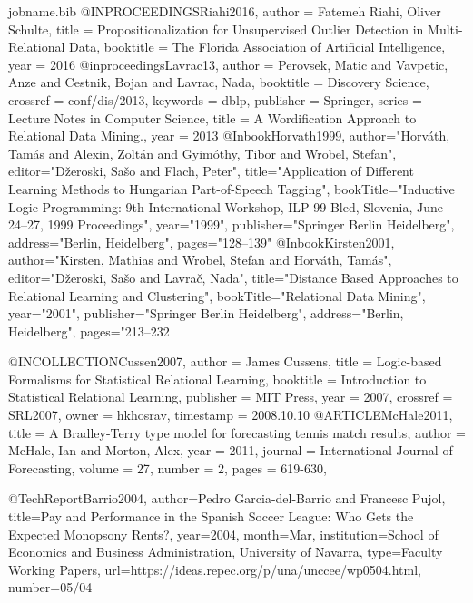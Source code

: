 {\begin{filecontents*}{jobname.bib}
	@INPROCEEDINGS{Riahi2016,
		author = {Fatemeh Riahi, Oliver Schulte},
		title = {Propositionalization for Unsupervised Outlier	Detection in Multi-Relational Data},
		booktitle = {The Florida Association of Artificial Intelligence},
		year = {2016}
	}
	@inproceedings{Lavrac13,
		author = {Perovsek, Matic and Vavpetic, Anze and Cestnik, Bojan and Lavrac, Nada},
		booktitle = {Discovery Science},
		crossref = {conf/dis/2013},
		keywords = {dblp},
		publisher = {Springer},
		series = {Lecture Notes in Computer Science},
		title = {A Wordification Approach to Relational Data Mining.},
		year = 2013
	}
	@Inbook{Horvath1999,
		author="Horv{\'a}th, Tam{\'a}s
		and Alexin, Zolt{\'a}n
		and Gyim{\'o}thy, Tibor
		and Wrobel, Stefan",
		editor="D{\v{z}}eroski, Sa{\v{s}}o
		and Flach, Peter",
		title="Application of Different Learning Methods to Hungarian Part-of-Speech Tagging",
		bookTitle="Inductive Logic Programming: 9th International Workshop, ILP-99 Bled, Slovenia, June 24--27, 1999 Proceedings",
		year="1999",
		publisher="Springer Berlin Heidelberg",
		address="Berlin, Heidelberg",
		pages="128--139"
	}
	@Inbook{Kirsten2001,
		author="Kirsten, Mathias
		and Wrobel, Stefan
		and Horv{\'a}th, Tam{\'a}s",
		editor="D{\v{z}}eroski, Sa{\v{s}}o
		and Lavra{\v{c}}, Nada",
		title="Distance Based Approaches to Relational Learning and Clustering",
		bookTitle="Relational Data Mining",
		year="2001",
		publisher="Springer Berlin Heidelberg",
		address="Berlin, Heidelberg",
		pages="213--232
	}
	
	
	@INCOLLECTION{Cussen2007,
		author = {James Cussens},
		title = {Logic-based Formalisms for Statistical Relational Learning},
		booktitle = {Introduction to Statistical Relational Learning},
		publisher = {MIT Press},
		year = {2007},
		crossref = {SRL2007},
		owner = {hkhosrav},
		timestamp = {2008.10.10}
	}
	@ARTICLE{McHale2011,
		title = {A Bradley-Terry type model for forecasting tennis match results},
		author = {McHale, Ian and Morton, Alex},
		year = {2011},
		journal = {International Journal of Forecasting},
		volume = {27},
		number = {2},
		pages = {619-630},
	}
	
	@TechReport{Barrio2004,
		author={Pedro Garcia-del-Barrio and Francesc Pujol},
		title={{Pay and Performance in the Spanish Soccer League: Who Gets the Expected Monopsony Rents?}},
		year=2004,
		month=Mar,
		institution={School of Economics and Business Administration, University of Navarra},
		type={Faculty Working Papers},
		url={https://ideas.repec.org/p/una/unccee/wp0504.html},
		number={05/04}
	}
	

\end{filecontents*}}
